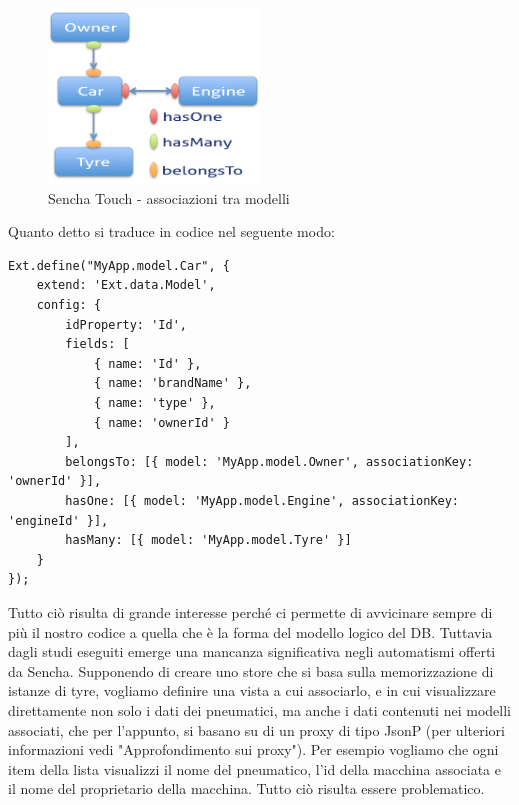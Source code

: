 \documentclass[10pt,a4paper,onecolumn]{article}
\begin{document}
\begin{figure}[h]
	\centering
	\includegraphics[width=0.5\textwidth]{img/associazioni}
	\caption{Sencha Touch - associazioni tra modelli}						
	\label{fig:associazioni}
\end{figure}

Quanto detto si traduce in codice nel seguente modo:
\begin{lstlisting}
Ext.define("MyApp.model.Car", {
    extend: 'Ext.data.Model',
    config: {
        idProperty: 'Id',
        fields: [
            { name: 'Id' },
            { name: 'brandName' },
            { name: 'type' },
            { name: 'ownerId' }
        ],
        belongsTo: [{ model: 'MyApp.model.Owner', associationKey: 'ownerId' }],
        hasOne: [{ model: 'MyApp.model.Engine', associationKey: 'engineId' }],
        hasMany: [{ model: 'MyApp.model.Tyre' }]
    }
});
\end{lstlisting}

Tutto ciò risulta di grande interesse perché ci permette di avvicinare sempre di più il nostro codice a quella che è la forma del modello logico del DB. Tuttavia dagli studi eseguiti emerge una mancanza significativa negli automatismi offerti da Sencha. Supponendo di creare uno store che si basa sulla memorizzazione di istanze di tyre, vogliamo definire una vista a cui associarlo, e in cui visualizzare direttamente non solo i dati dei pneumatici, ma anche i dati contenuti nei modelli associati, che per l'appunto, si basano su di un proxy di tipo JsonP (per ulteriori informazioni vedi "Approfondimento sui proxy"). Per esempio vogliamo che ogni item della lista visualizzi il nome del pneumatico, l'id della macchina associata e il nome del proprietario della macchina. Tutto ciò risulta essere problematico.
\end{document}
